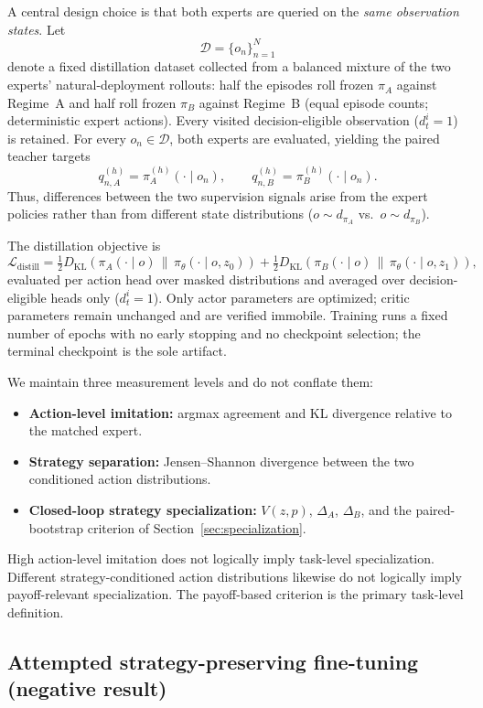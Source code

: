 A central design choice is that both experts are queried on the
\emph{same observation states}. Let
\[
\mathcal{D}
=
\{o_n\}_{n=1}^{N}
\]
denote a fixed distillation dataset collected from a balanced mixture of the
two experts' natural-deployment rollouts: half the episodes roll frozen
$\pi_A$ against Regime~A and half roll frozen $\pi_B$ against Regime~B
(equal episode counts; deterministic expert actions). Every visited
decision-eligible observation ($d_t^i=1$) is retained.
For every $o_n\in\mathcal{D}$, both experts are evaluated,
yielding the paired teacher targets
\[
q_{n,A}^{(h)}
=
\pi_A^{(h)}(\cdot\mid o_n),
\qquad
q_{n,B}^{(h)}
=
\pi_B^{(h)}(\cdot\mid o_n).
\]
Thus, differences between the two supervision signals arise from the expert
policies rather than from different state distributions
($o\!\sim\!d_{\pi_A}$ vs.\ $o\!\sim\!d_{\pi_B}$).

The distillation objective is
\[
\mathcal{L}_{\mathrm{distill}}
=
\tfrac{1}{2}D_{\mathrm{KL}}\!\left(\pi_A(\cdot\mid o)\,\|\,\pi_\theta(\cdot\mid o,z_0)\right)
+
\tfrac{1}{2}D_{\mathrm{KL}}\!\left(\pi_B(\cdot\mid o)\,\|\,\pi_\theta(\cdot\mid o,z_1)\right),
\]
evaluated per action head over masked distributions and averaged over
decision-eligible heads only ($d_t^i=1$). Only actor parameters are optimized;
critic parameters remain unchanged and are verified immobile. Training runs a
fixed number of epochs with no early stopping and no checkpoint selection; the
terminal checkpoint is the sole artifact.

We maintain three measurement levels and do not conflate them:
\begin{itemize}
  \item \textbf{Action-level imitation:} argmax agreement and KL divergence
  relative to the matched expert.
  \item \textbf{Strategy separation:} Jensen--Shannon divergence between the
  two conditioned action distributions.
  \item \textbf{Closed-loop strategy specialization:} $V(z,p)$, $\Delta_A$,
  $\Delta_B$, and the paired-bootstrap criterion of
  Section~\ref{sec:specialization}.
\end{itemize}
High action-level imitation does not logically imply task-level specialization.
Different strategy-conditioned action distributions likewise do not logically
imply payoff-relevant specialization. The payoff-based criterion is the primary
task-level definition.

\subsection{Attempted strategy-preserving fine-tuning (negative result)}
\label{sec:spppo}

